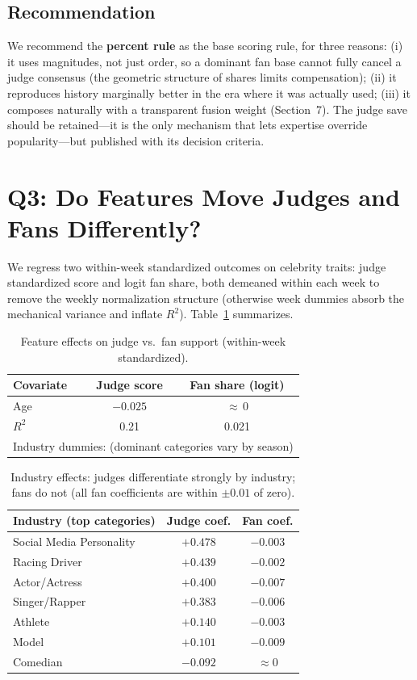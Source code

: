 \documentclass[12pt]{article}
\begin{document}
\subsection{Recommendation}
We recommend the \textbf{percent rule} as the base scoring rule, for three reasons:
(i) it uses magnitudes, not just order, so a dominant fan base cannot fully cancel a
judge consensus (the geometric structure of shares limits compensation);
(ii) it reproduces history marginally better in the era where it was actually used;
(iii) it composes naturally with a transparent fusion weight (Section~7). The judge
save should be retained---it is the only mechanism that lets expertise override
popularity---but published with its decision criteria.

\section{Q3: Do Features Move Judges and Fans Differently?}
\label{sec:q3}

We regress two within-week standardized outcomes on celebrity traits: judge
standardized score and logit fan share, both demeaned within each week to remove
the weekly normalization structure (otherwise week dummies absorb the mechanical
variance and inflate $R^2$). Table~\ref{tab:q3} summarizes.

\begin{table}[h]
\centering
\begin{tabular}{lcc}
\toprule
Covariate & Judge score & Fan share (logit) \\
\midrule
Age & $-0.025$ & ${\approx}\,0$ \\
$R^2$ & 0.21 & 0.021 \\
\midrule
\multicolumn{3}{l}{\small Industry dummies: (dominant categories vary by season)}\\
\bottomrule
\end{tabular}
\caption{Feature effects on judge vs.\ fan support (within-week standardized).}
\label{tab:q3}
\end{table}

\begin{table}[h]
\centering
\begin{tabular}{lcc}
\toprule
Industry (top categories) & Judge coef. & Fan coef. \\
\midrule
Social Media Personality & $+0.478$ & $-0.003$ \\
Racing Driver & $+0.439$ & $-0.002$ \\
Actor/Actress & $+0.400$ & $-0.007$ \\
Singer/Rapper & $+0.383$ & $-0.006$ \\
Athlete & $+0.140$ & $-0.003$ \\
Model & $+0.101$ & $-0.009$ \\
Comedian & $-0.092$ & $\approx 0$ \\
\bottomrule
\end{tabular}
\caption{Industry effects: judges differentiate strongly by industry; fans do not
(all fan coefficients are within $\pm0.01$ of zero).}
\label{tab:industry}
\end{table}
\end{document}
